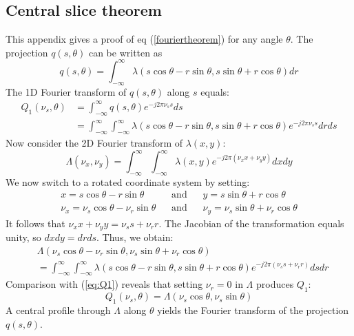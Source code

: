 \documentclass[11pt,oneside]{article}
\begin{document}
\subsection{Central slice theorem} \label{app:cs}
This appendix gives a proof of eq (\ref{fouriertheorem}) for any angle
$\theta$. The projection $q(s,\theta)$ can be written as
\begin{equation}
  q(s, \theta) = \int_{-\infty}^{\infty} \lambda(s \cos\theta - r\sin\theta, 
                                s \sin\theta + r\cos\theta) dr
\end{equation}
The 1D Fourier transform of $q(s,\theta)$ along $s$ equals:
\begin{align}
  Q_1(\nu_s, \theta) &= \int_{-\infty}^{\infty} q(s, \theta) e^{-j2\pi \nu_s s} ds \nonumber \\
  &= \int_{-\infty}^{\infty}\int_{-\infty}^{\infty}\lambda(s\cos\theta - r\sin\theta, 
                          s\sin\theta + r\cos\theta)e^{-j2\pi \nu_s s} dr ds
      \label{eq:Q1}
\end{align}
Now consider the 2D Fourier transform of $\lambda(x,y)$:
\begin{equation}
  \Lambda(\nu_x, \nu_y) = \int_{-\infty}^{\infty} \int_{-\infty}^{\infty} \lambda(x,y) 
       e^{-j2\pi (\nu_x x + \nu_y y)} dx dy
\end{equation}
We now switch to a rotated coordinate system by setting:
\begin{align}
   x = s \cos\theta - r\sin\theta \;\;\;&\mbox{and}& \;\;\;
   y = s\sin\theta + r\cos\theta\\
   \nu_x = \nu_s \cos\theta - \nu_r\sin\theta \;\;\;&\mbox{and}& \;\;\;
   \nu_y = \nu_s\sin\theta + \nu_r\cos\theta
\end{align}
It follows that $\nu_x x + \nu_y y = \nu_s s + \nu_r r$. The Jacobian
of the transformation equals unity, so $dx dy = dr ds$. Thus, we obtain:
\begin{align}
&\Lambda(\nu_s \cos\theta - \nu_r\sin\theta, 
      \nu_s\sin\theta + \nu_r\cos\theta) \nonumber \\
&= \int_{-\infty}^{\infty} \int_{-\infty}^{\infty} 
     \lambda(s \cos\theta - r\sin\theta, s\sin\theta + r\cos\theta) 
       e^{-j2\pi (\nu_s s + \nu_r r)} ds dr
\end{align}
Comparison with (\ref{eq:Q1}) reveals that setting $\nu_r = 0$ in
$\Lambda$ produces $Q_1$:
\begin{equation}
  Q_1(\nu_s, \theta) = \Lambda(\nu_s\cos\theta, \nu_s\sin\theta )
\end{equation}
A central profile through $\Lambda$ along $\theta$ yields the Fourier
transform of the projection $q(s,\theta)$.
\end{document}
